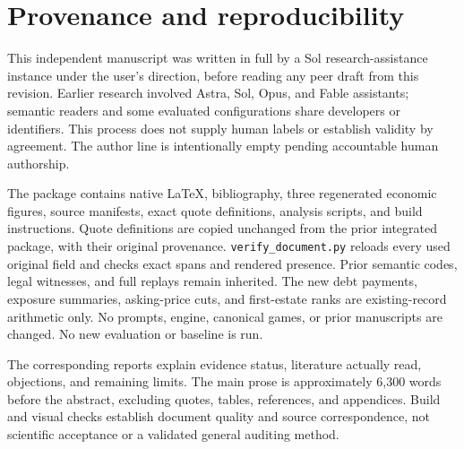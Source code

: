 \section{Provenance and reproducibility}

This independent manuscript was written in full by a Sol research-assistance instance under the user's direction, before reading any peer draft from this revision. Earlier research involved Astra, Sol, Opus, and Fable assistants; semantic readers and some evaluated configurations share developers or identifiers. This process does not supply human labels or establish validity by agreement. The author line is intentionally empty pending accountable human authorship.

The package contains native LaTeX, bibliography, three regenerated economic figures, source manifests, exact quote definitions, analysis scripts, and build instructions. Quote definitions are copied unchanged from the prior integrated package, with their original provenance. \texttt{verify\_document.py} reloads every used original field and checks exact spans and rendered presence. Prior semantic codes, legal witnesses, and full replays remain inherited. The new debt payments, exposure summaries, asking-price cuts, and first-estate ranks are existing-record arithmetic only. No prompts, engine, canonical games, or prior manuscripts are changed. No new evaluation or baseline is run.

The corresponding reports explain evidence status, literature actually read, objections, and remaining limits. The main prose is approximately 6,300 words before the abstract, excluding quotes, tables, references, and appendices. Build and visual checks establish document quality and source correspondence, not scientific acceptance or a validated general auditing method.
